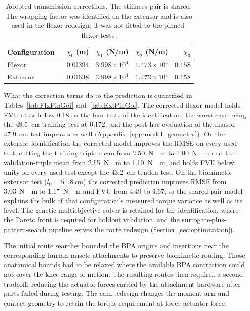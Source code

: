 \begin{table}[htbp]
\centering\small
\caption{Adopted transmission corrections. The stiffness pair is shared. The wrapping factor was identified on the extensor and is also used in the flexor redesign; it was not fitted to the pinned-flexor tests.}
\label{tab:AdoptedXi}
\begin{tabular}{@{}lrrrr@{}}
\toprule
Configuration & $\chi_{0}$ (m) & $\chi_{1}$ (N/m) & $\chi_{2}$ (N/m) & $\chi_{3}$\\
\midrule
Flexor & $0.00394$ & $3.998\times10^{4}$ & $1.473\times10^{4}$ & $0.158$\\
Extensor & $-0.00638$ & $3.998\times10^{4}$ & $1.473\times10^{4}$ & $0.158$\\
\bottomrule
\end{tabular}
\end{table} What the correction terms do to the prediction is quantified in Tables~\ref{tab:FlxPinGof} and~\ref{tab:ExtPinGof}. The corrected flexor model holds FVU at or below 0.18 on the four tests of the identification, the worst case being the \qty{48.5}{\cm} training test at 0.172, and the post hoc evaluation of the unused \qty{47.9}{\cm} test improves as well (Appendix~\ref{app:model_geometry}). On the extensor identification the corrected model improves the RMSE on every used test, cutting the training-triple mean from \qty{2.50}{\newton\cdot\meter} to \qty{1.00}{\newton\cdot\meter} and the validation-triple mean from \qty{2.55}{\newton\cdot\meter} to \qty{1.10}{\newton\cdot\meter}, and holds FVU below unity on every used test except the \qty{43.2}{\cm} tendon test. On the biomimetic extensor test ($l_{0} = \qty{51.8}{\cm}$) the corrected prediction improves RMSE from \qty{3.03}{\newton\cdot\meter} to \qty{1.17}{\newton\cdot\meter} and FVU from 4.49 to 0.67, so the shared-pair model explains the bulk of that configuration's measured torque variance as well as its level. The genetic multiobjective solver is retained for the identification, where the Pareto front is required for holdout validation, and the surrogate-plus-pattern-search pipeline serves the route redesign (Section~\ref{sec:optimization}).

The initial route searches bounded the BPA origins and insertions near the corresponding human muscle attachments to preserve biomimetic routing. Those anatomical bounds had to be relaxed where the available BPA contraction could not cover the knee range of motion. The resulting routes then required a second tradeoff: reducing the actuator forces carried by the attachment hardware after parts failed during testing. The cam redesign changes the moment arm and contact geometry to retain the torque requirement at lower actuator force.

